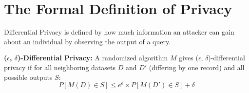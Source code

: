 \section{The Formal Definition of Privacy}
\label{sec:dp_formal_definition}

Differential Privacy is defined by how much information an attacker can gain about an individual by observing the output of a query.

\begin{definition}
\textbf{($\epsilon$, $\delta$)-Differential Privacy:} A randomized algorithm $M$ gives ($\epsilon$, $\delta$)-differential privacy if for all neighboring datasets $D$ and $D'$ (differing by one record) and all possible outputs $S$:
\begin{equation}
P[M(D) \in S] \le e^{\epsilon} \times P[M(D') \in S] + \delta
\end{equation}
\end{definition}

